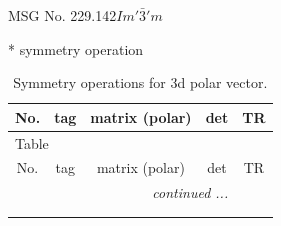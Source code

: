 \documentclass[fleqn,8pt]{jsarticle}
\begin{document}
\setcounter{MaxMatrixCols}{32}

\renewcommand{\tablename}{Table~}
\renewcommand{\figurename}{Figure~}
\begin{center}
\LARGE
MSG No. 229.142\quad$Im'\bar{3}'m$
\end{center}
* symmetry operation
\renewcommand{\arraystretch}{1.3}
\begin{longtable}{ccccc}
\caption{Symmetry operations for 3d polar vector.}
 \\
 \hline \hline
No. & tag & matrix (polar) & det & TR \\ \hline \endfirsthead

\multicolumn{4}{l}{\tablename\ \thetable{}} \\
 \hline \hline
No. & tag & matrix (polar) & det & TR \\ \hline \endhead

 \hline \hline
\multicolumn{4}{r}{\footnotesize\it continued ...} \\ \endfoot

 \hline \hline
\multicolumn{4}{r}{} \\ \endlastfoot


\end{longtable}
\end{document}
